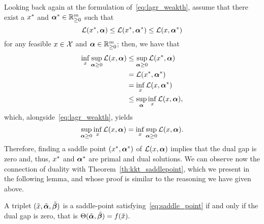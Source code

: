Looking back again at the formulation of~\eqref{eq:lagr_weakth}, assume that there exist a ${x}^*$ and ${\bm{\alpha}}^* \in \mathbb{R}_{\geq 0}^{m}$ such that 
\begin{equation}
    \nonumber
    \mathcal{L}({x}^*, \bm{\alpha}) \leq \mathcal{L}({x}^*, {\bm{\alpha}}^*) \leq \mathcal{L}(x, {\bm{\alpha}}^*)
\end{equation}
for any feasible $x \in \mathcal{X}$ and $\bm{\alpha} \in  \mathbb{R}_{\geq 0}^m$; then, we have that 
\begin{equation}
    \nonumber
    \begin{aligned}
        \inf_{x} \sup_{\bm{\alpha} \geq 0} \mathcal{L}(x, \bm{\alpha}) &\leq \sup_{\bm{\alpha} \geq 0} \mathcal{L}({x}^*, \bm{\alpha}) \\
        & = \mathcal{L}({x}^*, {\bm{\alpha}}^*) \\
        & = \inf_{x} \mathcal{L}(x, {\bm{\alpha}}^*) \\
        & \leq \sup_{\bm{\alpha}} \inf_{x} \mathcal{L}(x, \bm{\alpha}), 
    \end{aligned}
\end{equation}
which, alongside~\eqref{eq:lagr_weakth}, yields 
\begin{equation}
    \label{eq:lagr_strongth}
    \sup_{\fv{\alpha} \geq 0} \inf_{x} \lagr(x, \fv{\alpha}) = \inf_{x} \sup_{\fv{\alpha} \geq 0} \lagr(x, \fv{\alpha}).
\end{equation}
Therefore, finding a saddle point $({x}^*, {\bm{\alpha}}^*)$ of $\mathcal{L}(x, \bm{\alpha})$ implies that the dual gap is zero and, thus, ${x}^*$ and ${\bm{\alpha}}^*$ are primal and dual solutions.
%
We can observe now the connection of duality with Theorem~\ref{th:kkt_saddlepoint}, which we present in the following lemma, and whose proof is similar to the reasoning we have given above.
\begin{lemma}
    A triplet $(\tilde{x}, \tilde{\bm{\alpha}}, \tilde{\bm{\beta}})$ is a saddle-point satisfying~\eqref{eq:saddle_point} if and only if the dual gap is zero, that is 
    $ \Theta(\tilde{\bm{\alpha}}, \tilde{\bm{\beta}}) = f(\tilde{x}) .$
\end{lemma}

